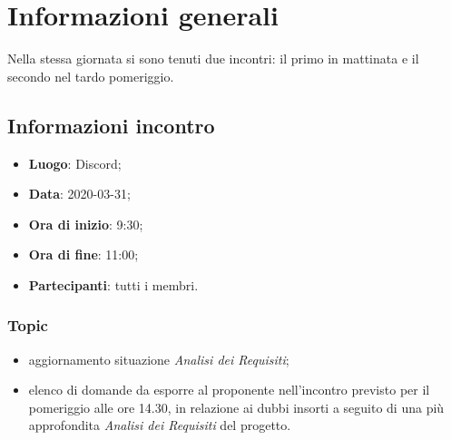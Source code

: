 \section{Informazioni generali}
Nella stessa giornata si sono tenuti due incontri: il primo in mattinata e il secondo nel tardo pomeriggio.
\subsection{Informazioni incontro}
\begin{itemize}
\item \textbf{Luogo}: Discord;
\item \textbf{Data}: 2020-03-31;
\item \textbf{Ora di inizio}: 9:30;
\item \textbf{Ora di fine}: 11:00;
\item \textbf{Partecipanti}: tutti i membri.
\end{itemize}

\subsubsection{Topic}
\begin{itemize}
\item aggiornamento situazione \textit{Analisi dei Requisiti};
\item elenco di domande da esporre al proponente nell'incontro previsto per il pomeriggio alle ore 14.30, in relazione ai dubbi insorti a seguito di una più approfondita \textit{Analisi dei Requisiti} del progetto.
\end{itemize}